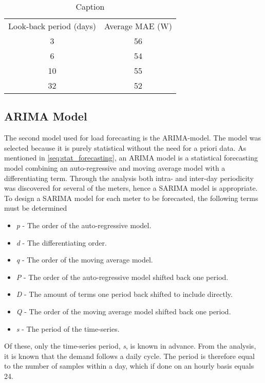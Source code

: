 \begin{table}[]
    \centering
    \begin{tabular}{c|c}
         Look-back period (days)& Average MAE (W) \\
         3& 56\\
         6& 54\\
         10& 55\\
         32& 52
    \end{tabular}
    \caption[Average MAE persistence models]{Caption}
    \label{tab:avg_mae_chiwoza_med_persistence_2023}
\end{table}

\subsection{ARIMA Model}
The second model used for load forecasting is the ARIMA-model. The model was selected because it is purely statistical without the need for a priori data. As mentioned in \ref{seq:stat_forecasting}, an ARIMA model is a statistical forecasting model combining an auto-regressive and moving average model with a differentiating term. Through the analysis both intra- and inter-day periodicity was discovered for several of the meters, hence a SARIMA model is appropriate. To design a SARIMA model for each meter to be forecasted, the following terms must be determined
\begin{itemize}
    \item \textit{p}    -   The order of the auto-regressive model.
    \item \textit{d}    -   The differentiating order.
    \item \textit{q}    -   The order of the moving average model.
    \item \textit{P}    -   The order of the auto-regressive model shifted back one period.
    \item \textit{D}    -   The amount of terms one period back shifted to include directly.
    \item \textit{Q}    -   The order of the moving average model shifted back one period.
    \item \textit{s}    -   The period of the time-series.
\end{itemize}

Of these, only the time-series period, \textit{s}, is known in advance. From the analysis, it is known that the demand follows a daily cycle. The period is therefore equal to the number of samples within a day, which if done on an hourly basis equals 24.\\


